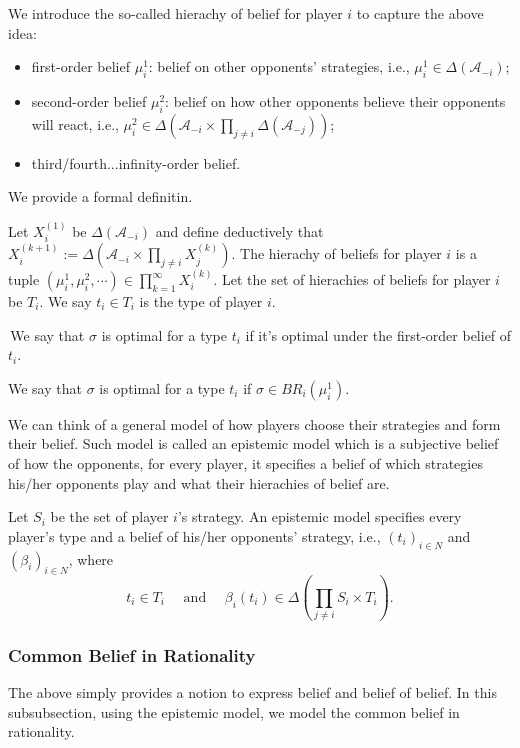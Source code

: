 We introduce the so-called hierachy of belief for player $i$ to capture the above idea:
\begin{itemize}
    \item first-order belief $\mu^1_i$: belief on other opponents' strategies, i.e., $\mu^1_i \in \Delta(\mathcal{A}_{-i})$;
    \item second-order belief $\mu^2_i$: belief on how other opponents believe their opponents will react, i.e., $\mu^2_i \in \Delta(\mathcal{A}_{-i}\times \prod_{j\neq i} \Delta(\mathcal{A}_{-j}))$;
    \item third/fourth...infinity-order belief.
\end{itemize}

We provide a formal definitin.
\begin{definition}
    Let $X_i^{(1)}$ be $\Delta(\mathcal{A}_{-i})$ and define deductively that $X_i^{(k+1)}:= \Delta(\mathcal{A}_{-i}\times \prod_{j\neq i}X_j^{(k)})$. The hierachy of beliefs for player $i$ is a tuple $(\mu_i^1,\mu_i^2,\cdots)\in \prod_{k=1}^{\infty}X_i^{(k)}$.
    Let the set of hierachies of beliefs for player $i$ be $T_i$. We say $t_i\in T_i$ is the type of player $i$.
\end{definition}
\,We say that $\sigma$ is optimal for a type $t_i$ if it's optimal under the first-order belief of $t_i$.
\begin{definition}
    We say that $\sigma$ is optimal for a type $t_i$ if $\sigma\in BR_i(\mu_i^1)$.
\end{definition}

We can think of a general model of how players choose their strategies and form their belief. Such model is called an epistemic model which is a subjective belief of how the opponents, for every player, it specifies a belief of which strategies his/her opponents play and what their hierachies of belief are.
\begin{definition}
    Let $S_i$ be the set of player $i$'s strategy. An epistemic model specifies every player's type and a belief of his/her opponents' strategy, i.e., $(t_i)_{i\in N}$ and $(\beta_i)_{i\in N}$, where $$t_i\in T_i \quad \text{ and } \quad\beta_i(t_i)\in \Delta(\prod_{j\neq i} S_i\times T_i).$$ 
\end{definition}

\subsubsection{Common Belief in Rationality}
The above simply provides a notion to express belief and belief of belief. In this subsubsection, using the epistemic model, we model the common belief in rationality.

